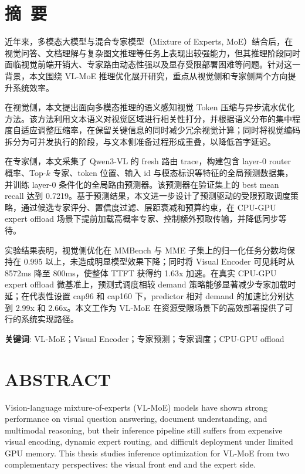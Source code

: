\newpage

\setcounter{page}{1} %

{
\let\clearpage\relax
\chapter*{摘\ 要}
}

近年来，多模态大模型与混合专家模型（Mixture of Experts, MoE）结合后，在视觉问答、文档理解与复杂图文推理等任务上表现出较强能力，但其推理阶段同时面临视觉前端开销大、专家路由动态性强以及显存受限部署困难等问题。针对这一背景，本文围绕 VL-MoE 推理优化展开研究，重点从视觉侧和专家侧两个方向提升系统效率。

在视觉侧，本文提出面向多模态推理的语义感知视觉 Token 压缩与异步流水优化方法。该方法利用文本语义对视觉区域进行相关性打分，并根据语义分布的集中程度自适应调整压缩率，在保留关键信息的同时减少冗余视觉计算；同时将视觉编码拆分为可并发执行的阶段，与文本侧准备过程形成重叠，以降低首字延迟。

在专家侧，本文采集了 Qwen3-VL 的 fresh 路由 trace，构建包含 layer-0 router 概率、Top-$k$ 专家、token 位置、输入 id 与模态标识等特征的全局预测数据集，并训练 layer-0 条件化的全局路由预测器。该预测器在验证集上的 best mean recall 达到 0.7219。基于预测结果，本文进一步设计了预测驱动的受限预取调度策略，通过候选专家评分、置信度过滤、层距衰减和预算约束，在 CPU-GPU expert offload 场景下提前加载高概率专家、控制额外预取传输，并降低同步等待。

实验结果表明，视觉侧优化在 MMBench 与 MME 子集上的归一化任务分数均保持在 0.995 以上，未造成明显模型效果下降；同时将 Visual Encoder 可见耗时从 8572ms 降至 800ms，使整体 TTFT 获得约 1.63x 加速。在真实 CPU-GPU expert offload 微基准上，预测式调度相较 demand 策略能够显著减少专家加载时延；在代表性设置 cap96 和 cap160 下，predictor 相对 demand 的加速比分别达到 2.99x 和 2.66x。本文工作为 VL-MoE 在资源受限场景下的高效部署提供了可行的系统实现路径。

\vspace{8mm}
\textbf{关键词}: VL-MoE；Visual Encoder；专家预测；专家调度；CPU-GPU offload

\newpage
{
\let\clearpage\relax
\chapter*{ABSTRACT}
}

Vision-language mixture-of-experts (VL-MoE) models have shown strong performance on visual question answering, document understanding, and multimodal reasoning, but their inference pipeline still suffers from expensive visual encoding, dynamic expert routing, and difficult deployment under limited GPU memory. This thesis studies inference optimization for VL-MoE from two complementary perspectives: the visual front end and the expert side.

